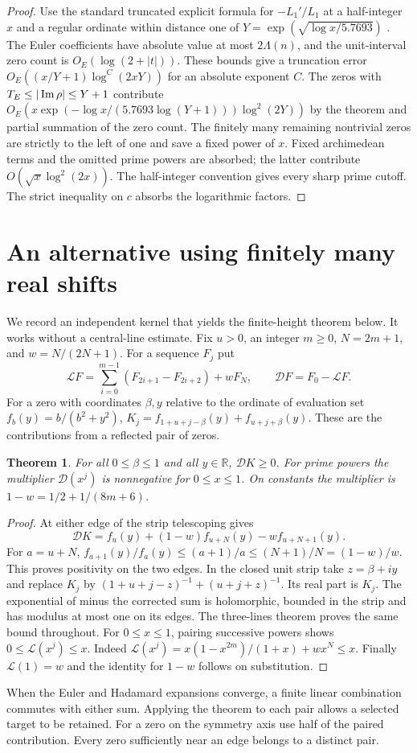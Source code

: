 \documentclass[11pt]{article}
\newtheorem{theorem}{Theorem}[section]\newtheorem{lemma}[theorem]{Lemma}\newtheorem{corollary}[theorem]{Corollary}
\newcommand{\R}{\mathbb R}\newcommand{\Q}{\mathbb Q}\newcommand{\C}{\mathbb C}\newcommand{\Z}{\mathbb Z}
\begin{document}
\begin{proof}
Use the standard truncated explicit formula for $-L_1'/L_1$ at a half-integer $x$ and a regular ordinate within distance one of $Y=\exp(\sqrt{\log x/5.7693})$ \cite[Chapter 5]{IK}. The Euler coefficients have absolute value at most $2\Lambda(n)$, and the unit-interval zero count is $O_E(\log(2+|t|))$. These bounds give a truncation error $O_E((x/Y+1)\log^C(2xY))$ for an absolute exponent $C$. The zeros with $T_E\le|\operatorname{Im}\rho|\le Y+1$ contribute $O_E(x\exp(-\log x/(5.7693\log(Y+1)))\log^2(2Y))$ by the theorem and partial summation of the zero count. The finitely many remaining nontrivial zeros are strictly to the left of one and save a fixed power of $x$. Fixed archimedean terms and the omitted prime powers are absorbed; the latter contribute $O(\sqrt{x}\log^2(2x))$. The half-integer convention gives every sharp prime cutoff. The strict inequality on $c$ absorbs the logarithmic factors.
\end{proof}


\section{An alternative using finitely many real shifts}\label{signed}
We record an independent kernel that yields the finite-height theorem below. It works without a central-line estimate. Fix $u>0$, an integer $m\ge0$, $N=2m+1$, and $w=N/(2N+1)$. For a sequence $F_j$ put
\[
  \mathcal LF=\sum_{i=0}^{m-1}(F_{2i+1}-F_{2i+2})+w F_N,
  \qquad \mathcal DF=F_0-\mathcal LF .
\]
For a zero with coordinates $\beta,y$ relative to the ordinate of evaluation set $f_b(y)=b/(b^2+y^2)$, $K_j=f_{1+u+j-\beta}(y)+f_{u+j+\beta}(y)$. These are the contributions from a reflected pair of zeros.
\begin{theorem}
For all $0\le\beta\le1$ and all $y\in\R$, $\mathcal DK\ge0$. For prime powers the multiplier $\mathcal D(x^j)$ is nonnegative for $0\le x\le1$. On constants the multiplier is $1-w=1/2+1/(8m+6)$.
\end{theorem}
\begin{proof}
At either edge of the strip telescoping gives
\[
    \mathcal DK=f_u(y)+(1-w)f_{u+N}(y)-wf_{u+N+1}(y).
\]
For $a=u+N$, $f_{a+1}(y)/f_a(y)\le(a+1)/a\le(N+1)/N=(1-w)/w$. This proves positivity on the two edges. In the closed unit strip take $z=\beta+iy$ and replace $K_j$ by $(1+u+j-z)^{-1}+(u+j+z)^{-1}$. Its real part is $K_j$. The exponential of minus the corrected sum is holomorphic, bounded in the strip and has modulus at most one on its edges. The three-lines theorem proves the same bound throughout. For $0\le x\le1$, pairing successive powers shows $0\le\mathcal L(x^j)\le x$. Indeed $\mathcal L(x^j)=x(1-x^{2m})/(1+x)+wx^N\le x$. Finally $\mathcal L(1)=w$ and the identity for $1-w$ follows on substitution.
\end{proof}
When the Euler and Hadamard expansions converge, a finite linear combination commutes with either sum. Applying the theorem to each pair allows a selected target to be retained. For a zero on the symmetry axis use half of the paired contribution. Every zero sufficiently near an edge belongs to a distinct pair.
\end{document}
